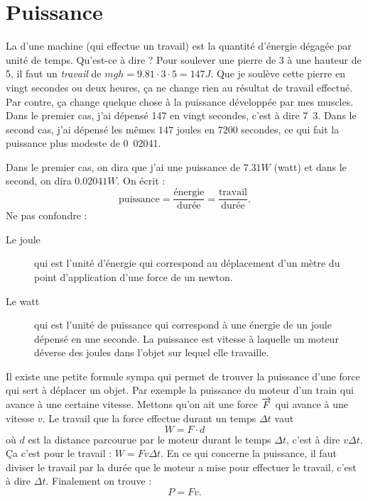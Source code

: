 \section{Puissance}

La  d'une machine (qui effectue un travail) est la quantité d'énergie dégagée par unité de temps. Qu'est-ce à dire ? Pour soulever une pierre de \unit{3}{\kilogram} à une hauteur de \unit{5}{\meter}, il faut un \emph{travail} de $mgh=9.81\cdot 3\cdot 5=147 J$. Que je soulève cette pierre en vingt secondes ou deux heures, ça ne change rien au résultat de travail effectué. Par contre, ça change quelque chose à la puissance développée par mes muscles. Dans le premier cas, j'ai dépensé \unit{147}{\joule}    en vingt secondes, c'est à dire \unit{7.3}{\joule\per\second}. Dans le second cas, j'ai dépensé les mêmes $147$ joules en $7200$ secondes, ce qui fait la puissance plus modeste de \unit{0.02041}{\joule\per\second}.

Dans le premier cas, on dira que j'ai une puissance de $7.31W$ (watt) et dans le second, on dira $0.02041W$. On écrit :
\[
 \text{puissance}=\frac{\text{énergie}}{\text{durée}}=\frac{\text{travail}}{\text{durée}}.
\]
Ne pas confondre :
\begin{description}
\item[Le joule] qui est l'unité d'énergie qui correspond au déplacement d'un mètre du point d'application d'une force de un newton.
\item[Le watt] qui est l'unité de puissance qui correspond à une énergie de un joule dépensé en une seconde. La puissance est vitesse à laquelle un moteur déverse des joules dans l'objet sur lequel elle travaille.
\end{description}

Il existe une petite formule sympa qui permet de trouver la puissance d'une force qui sert à déplacer un objet. Par exemple la puissance du moteur d'un train qui avance à une certaine vitesse. Mettons qu'on ait une force $\overrightarrow{F}$ qui avance à une vitesse $v$. Le travail que la force effectue durant un temps $\Delta t$ vaut 
\[ 
 W=F\cdot d 
\]
où $d$ est la distance parcourue par le moteur durant le temps $\Delta t$, c'est à dire $v\Delta t$. Ça c'est pour le travail : $W=Fv\Delta t$. En ce qui concerne la puissance, il faut diviser le travail par la durée que le moteur a mise pour effectuer le travail, c'est à dire $\Delta t$. Finalement on trouve :
\begin{equation} \label{eq_puissFv}
  P=Fv.
\end{equation}
